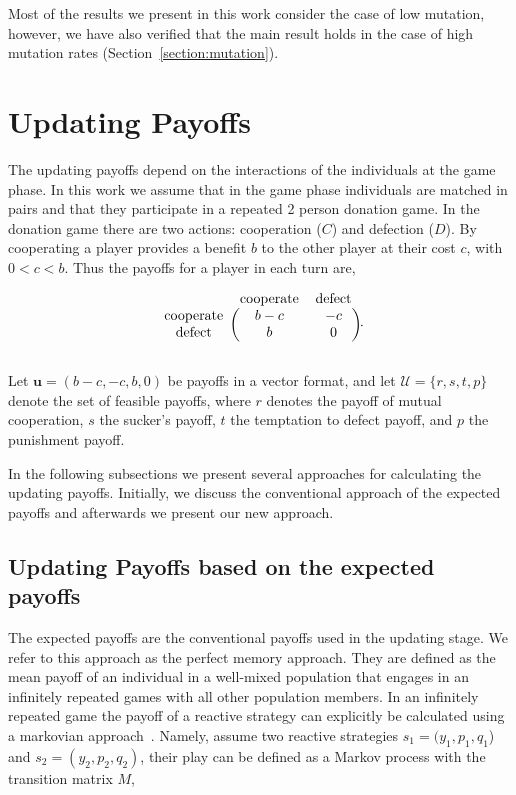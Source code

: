\documentclass[11pt]{article}
\theoremstyle{plainCl1}
\theoremstyle{plainCl2}
\begin{document}
Most of the results we present in this work consider the case of low mutation,
however, we have also verified that the main result holds in the case of
high mutation rates (Section~\ref{section:mutation}).

\section{Updating Payoffs}\label{section:updating_payoffs}

The updating payoffs depend on the interactions of the individuals at the game
phase. In this work we assume that in the game phase individuals are matched in
pairs and that they participate in a repeated 2 person donation game. In the
donation game there are two actions: cooperation (\(C\)) and defection (\(D\)).
By cooperating a player provides a benefit \(b\) to the other player at their
cost \(c\), with \(0 < c < b\). Thus the payoffs for a player in each turn are,

\begin{equation}
    \begin{blockarray}{ccc}
        & \text{cooperate} & \text{defect} \\
        \begin{block}{c(cc)}
            \text{cooperate} & b - c & -c \\
            \text{defect} & b & 0 \\
        \end{block}
    \end{blockarray}.
\end{equation}

Let \(\mathbf{u} = (b-c, -c, b, 0)\) be payoffs in a vector format, and let \(\mathcal{U}
= \{r, s, t, p\}\) denote the set of feasible payoffs, where \(r\) denotes the
payoff of mutual cooperation, \(s\) the sucker's payoff, \(t\) the temptation to
defect payoff, and \(p\) the punishment payoff.

In the following subsections we present several approaches for calculating
the updating payoffs. Initially, we discuss the conventional approach of the
expected payoffs and afterwards we present our new approach.

\subsection{Updating Payoffs based on the expected payoffs}\label{section:perfect_memory}

The expected payoffs are the conventional payoffs used in the updating stage. We
refer to this approach as the perfect memory approach. They are defined as the
mean payoff of an individual in a well-mixed population that engages in an
infinitely repeated games with all other population members. In an infinitely
repeated game the payoff of a reactive strategy can explicitly be calculated
using a markovian approach~\cite{nowak:APC:1989}. Namely, assume two reactive
strategies $s_1\!=\!(y_1, p_1, q_1$) and $s_2\!=\!(y_2,p_2,q_2)$, their play can
be defined as a Markov process with the transition matrix \(M\),
\end{document}
